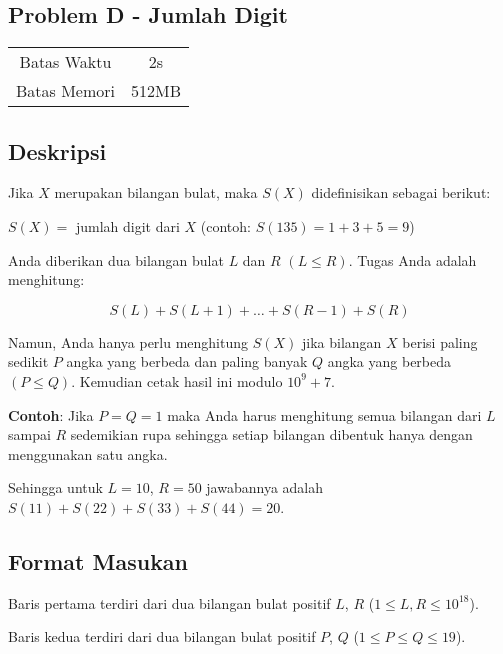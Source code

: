 \documentclass{article}
\begin{document}
\begin{center}
    \section*{Problem D - Jumlah Digit} %
    \begin{tabular}{ | c c | }
        \hline
        Batas Waktu  & 2s \\    %
        Batas Memori & 512MB \\  %
        \hline
    \end{tabular}
\end{center}

\subsection*{Deskripsi}

Jika $X$ merupakan bilangan bulat, maka $S(X)$ didefinisikan sebagai berikut:

\begin{center}
    $S(X) = $ jumlah digit dari $X$ (contoh: $S(135) = 1 + 3 + 5 = 9$)
\end{center}

Anda diberikan dua bilangan bulat $L$ dan $R$ $(L \leq R)$. Tugas Anda adalah menghitung:

$$S(L) + S(L + 1) + \dots + S(R - 1) + S(R)$$

Namun, Anda hanya perlu menghitung $S(X)$ jika bilangan $X$ berisi paling sedikit $P$ angka yang berbeda dan paling banyak $Q$ angka yang berbeda $(P \leq Q)$. Kemudian cetak hasil ini modulo $10^9 + 7$.

\textbf{Contoh}: Jika $P = Q = 1$ maka Anda harus menghitung semua bilangan dari $L$ sampai $R$ sedemikian rupa sehingga setiap bilangan dibentuk hanya dengan menggunakan satu angka.

Sehingga untuk $L = 10$, $R = 50$ jawabannya adalah $S(11) + S(22) + S(33) + S(44) = 20$.

\subsection*{Format Masukan}

Baris pertama terdiri dari dua bilangan bulat positif $L$, $R$ ($1 \leq L, R \leq 10^{18}$).

Baris kedua terdiri dari dua bilangan bulat positif $P$, $Q$ ($1 \leq P \leq Q \leq 19$).
\end{document}
